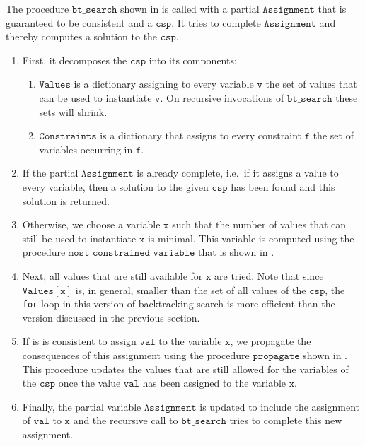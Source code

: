 The procedure $\mathtt{bt\_search}$ shown in  is called with a
partial $\mathtt{Assignment}$ that is guaranteed to be 
consistent and a $\mathtt{csp}$.  It tries to complete $\mathtt{Assignment}$ and thereby computes a solution to the $\mathtt{csp}$.
\begin{enumerate}
\item First, it decomposes the $\mathtt{csp}$ into its components:
      \begin{enumerate}
      \item $\mathtt{Values}$ is a dictionary assigning to every variable $\mathtt{v}$ the set of values 
            that can be used to instantiate $\mathtt{v}$.  On recursive invocations of $\mathtt{bt\_search}$
            these sets will shrink.
      \item $\mathtt{Constraints}$ is a dictionary that assigns to every constraint $\mathtt{f}$ the set of
            variables occurring in $\mathtt{f}$.
      \end{enumerate}
\item If the partial $\mathtt{Assignment}$ is already complete, i.e.~if it assigns a value to every variable, 
      then a solution to the given $\mathtt{csp}$ has been found and this solution is returned.
\item Otherwise, we choose a variable $\mathtt{x}$ such that the number of values that can still be used to
      instantiate $\mathtt{x}$ is minimal.  This variable is computed using the procedure
      $\mathtt{most\_constrained\_variable}$ that is shown in .
\item Next, all values that are still available for $\mathtt{x}$ are tried.  Note that since
      $\mathtt{Values[x]}$ is, in general, smaller than the set of all values of the $\mathtt{csp}$,
      the \texttt{for}-loop in this version of backtracking search is more efficient than the version discussed
      in the previous section. 
\item If is is consistent to assign $\mathtt{val}$ to the variable $\mathtt{x}$, we propagate the consequences
      of this assignment using the procedure $\mathtt{propagate}$ shown in
      .
      This procedure updates the values that are still allowed for the variables of the $\mathtt{csp}$ once the
      value $\mathtt{val}$ has been assigned to the variable $\mathtt{x}$.
\item Finally, the partial variable $\mathtt{Assignment}$ is updated to include the assignment of 
      $\mathtt{val}$ to $\mathtt{x}$ and the recursive call to $\mathtt{bt\_search}$ tries to complete this new
      assignment. 
\end{enumerate}

